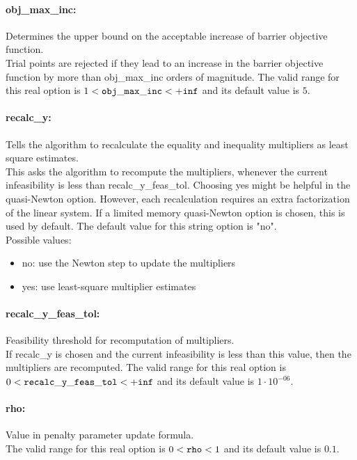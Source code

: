 \paragraph{obj\_max\_inc:}\label{sec:obj_max_inc} Determines the upper bound on the acceptable increase of barrier objective function. $\;$ \\
 Trial points are rejected if they lead to an
increase in the barrier objective function by
more than obj\_max\_inc orders of magnitude. The valid range for this real option is 
$1 <  {\tt obj\_max\_inc } <  {\tt +inf}$
and its default value is $5$.


\paragraph{recalc\_y:}\label{sec:recalc_y} Tells the algorithm to recalculate the equality and inequality multipliers as least square estimates. $\;$ \\
 This asks the algorithm to recompute the
multipliers, whenever the current infeasibility
is less than recalc\_y\_feas\_tol. Choosing yes
might be helpful in the quasi-Newton option. 
However, each recalculation requires an extra
factorization of the linear system.  If a limited
memory quasi-Newton option is chosen, this is
used by default.
The default value for this string option is "no".
\\ 
Possible values:
\begin{itemize}
   \item no: use the Newton step to update the multipliers
   \item yes: use least-square multiplier estimates
\end{itemize}

\paragraph{recalc\_y\_feas\_tol:}\label{sec:recalc_y_feas_tol} Feasibility threshold for recomputation of multipliers. $\;$ \\
 If recalc\_y is chosen and the current
infeasibility is less than this value, then the
multipliers are recomputed. The valid range for this real option is 
$0 <  {\tt recalc\_y\_feas\_tol } <  {\tt +inf}$
and its default value is $1 \cdot 10^{-06}$.


\paragraph{rho:}\label{sec:rho} Value in penalty parameter update formula. $\;$ \\
 The valid range for this real option is 
$0 <  {\tt rho } <  1$
and its default value is $0.1$.


